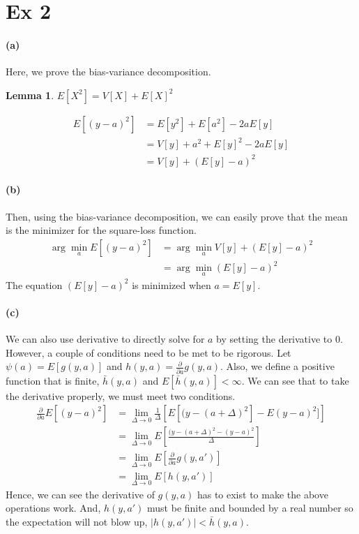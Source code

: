\documentclass[11pt, letterpaper]{article}
\newtheorem{lemma}{Lemma}
\begin{document}
\newpage
\section{Ex 2}
\paragraph{(a)} Here, we prove the bias-variance decomposition.
\begin{lemma}$E[X^2] = V[X] + E[X]^2$\end{lemma}
\begin{align*}
    E[(y-a)^2] &= E[y^2] + E[a^2] - 2aE[y] \\
        &= V[y] + a^2 + E[y]^2 - 2aE[y] \\
        &= V[y] + (E[y] - a)^2
\end{align*}

\paragraph{(b)} Then, using the bias-variance decomposition, we can easily prove that the mean is the minimizer for the square-loss function.
\begin{align*}
    \arg \mathop{\min}_a E[(y-a)^2]
        &= \arg \mathop{\min}_a V[y] + (E[y] - a)^2 \\
        &= \arg \mathop{\min}_a (E[y] - a)^2
\end{align*}
The equation $(E[y] - a)^2$ is minimized when $a = E[y]$.

\paragraph{(c)} We can also use derivative to directly solve for $a$ by setting the derivative to 0. However, a couple of conditions need to be met to be rigorous. Let $\psi(a) = E[g(y, a)]$ and $h(y, a) = \frac{\partial}{\partial a} g(y, a)$. Also, we define a positive function that is finite, $\bar{h}(y, a)$ and $E[\bar{h}(y, a)] < \infty$. We can see that to take the derivative properly, we must meet two conditions.
\begin{align*}
    \frac{\partial}{\partial a} E[(y-a)^2]
        &= \lim_{\Delta \rightarrow 0} \frac{1}{\Delta}\left[ E[(y-(a+\Delta)^2] - E(y-a)^2] \right] \\
        &= \lim_{\Delta \rightarrow 0} E\left[ \frac{(y-(a+\Delta)^2 - (y-a)^2}{\Delta} \right] \\
        &= \lim_{\Delta \rightarrow 0} E\left[ \frac{\partial}{\partial a} g(y, a') \right] \\
        &= \lim_{\Delta \rightarrow 0} E\left[ h(y, a') \right]
\end{align*}
Hence, we can see the derivative of $g(y, a)$ has to exist to make the above operations work. And, $h(y, a')$ must be finite and bounded by a real number so the expectation will not blow up, $|h(y, a')| < \bar{h}(y, a)$.
\end{document}

